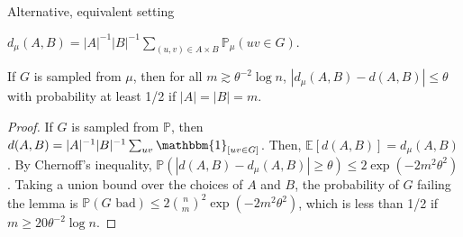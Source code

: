 \documentclass{beamer}
\newcommand{\1}{\mathbbm{1}}
\newcommand{\indicator}[1]{\1_{[#1]}}
\newcommand{\Exp}[1]{\mathbb{E}\left [#1 \right ]}
\newcommand{\Prob}{\mathbb{P}}
\begin{document}
\begin{frame}{Alternative, equivalent setting}
  \begin{definition}
    $d_\mu(A, B) = |A|^{-1} |B|^{-1} \sum_{(u, v) \in A \times B} \Prob_\mu(uv \in G)$.
  \end{definition}

  \pause

  \begin{lemma}
    If $G$ is sampled from $\mu$, then for all $m \gtrsim \theta^{-2} \log n$, $|d_\mu(A,
      B) - d(A, B)| \le \theta$ with probability at least 1/2 if $|A| = |B| = m$.
  \end{lemma}

  \pause

  \begin{proof}
    \pause
    If $G$ is sampled from $\Prob$, then $d(A, B) = |A|^{-1} |B|^{-1} \sum_{uv}
      \indicator{uv \in G}$.
    \pause
    Then, $\Exp{d(A, B)} = d_\mu(A, B)$.
    \pause
    By Chernoff's inequality, $\Prob(|d(A, B) - d_\mu(A, B)| \ge \theta) \le 2\exp(-2
      m^2 \theta^2)$.
    \pause
    Taking a union bound over the choices of $A$ and $B$, the probability of $G$
    failing the lemma is $\Prob(G \text{ bad}) \le 2 {n \choose m}^2 \exp(-2 m^2
      \theta^2)$, which is less than 1/2 if $m \ge 20 \theta^{-2} \log n$.
  \end{proof}
\end{frame}
\end{document}
